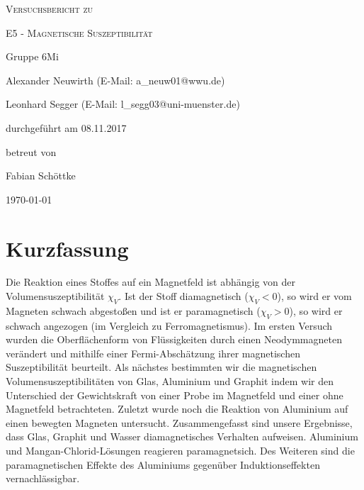 \documentclass[
	a4paper,
	12pt,
	pagesize,
	ngerman
]{scrartcl}
\begin{document}
	
	\begin{titlepage}
		\centering
		{\scshape\LARGE Versuchsbericht zu \par}
		\vspace{1cm}
		{\scshape\huge E5 - Magnetische Suszeptibilität\par}
		\vspace{2.5cm}
		{\LARGE Gruppe 6Mi \par}
		\vspace{0.5cm}
		
		{\large Alexander Neuwirth (E-Mail: a\_neuw01@wwu.de) \par}
		{\large Leonhard Segger (E-Mail: l\_segg03@uni-muenster.de) \par}
		\vfill
		
		durchgeführt am 08.11.2017\par
		betreut von\par
		{\large Fabian Schöttke}
		
		\vfill
		
		{\large \today\par}
	\end{titlepage}
	\tableofcontents
	\newpage
	
	\section{Kurzfassung}
	Die Reaktion eines Stoffes auf ein Magnetfeld ist abhängig von der Volumensuszeptibilität $\chi_V$. Ist der Stoff diamagnetisch ($\chi_V<0$), so wird er vom Magneten schwach abgestoßen und ist er paramagnetisch ($\chi_V>0$), so wird er schwach angezogen (im Vergleich zu Ferromagnetismus).\newline %
	Im ersten Versuch wurden die Oberflächenform von Flüssigkeiten durch einen Neodymmagneten verändert und mithilfe einer Fermi-Abschätzung ihrer magnetischen Suszeptibilität beurteilt. %
	Als nächstes bestimmten wir die magnetischen Volumensuszeptibilitäten von Glas, Aluminium und Graphit indem wir den Unterschied der Gewichtskraft von einer Probe im Magnetfeld und einer ohne Magnetfeld betrachteten. 
	Zuletzt wurde noch die Reaktion von Aluminium auf einen bewegten Magneten untersucht.
	Zusammengefasst sind unsere Ergebnisse, dass Glas, Graphit und Wasser diamagnetisches Verhalten aufweisen. Aluminium und Mangan-Chlorid-Lösungen reagieren paramagnetsich. Des Weiteren sind die paramagnetischen Effekte des Aluminiums gegenüber Induktionseffekten vernachlässigbar. 
	
\end{document}
